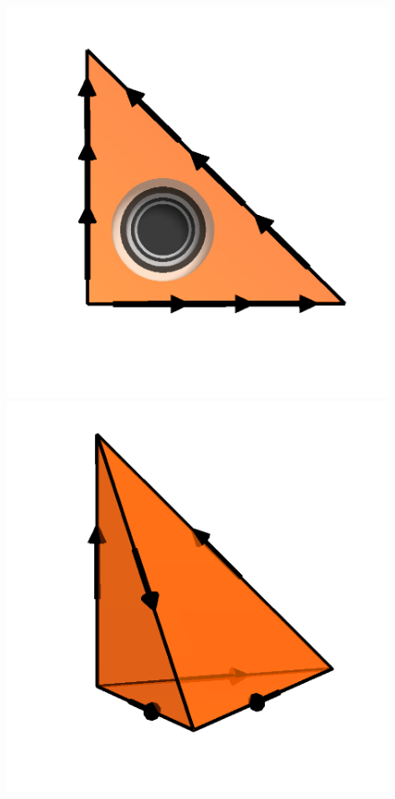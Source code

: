 \begin{figure}
\begin{center}
    \includegraphics[width=\elmfigsizetriple]{chapters/kirby-6/png/NED1_3_2d.png} \\
    \includegraphics[width=\elmfigsizetriple]{chapters/kirby-6/png/NED1_1_3d.png}

\end{center}
\end{figure}
